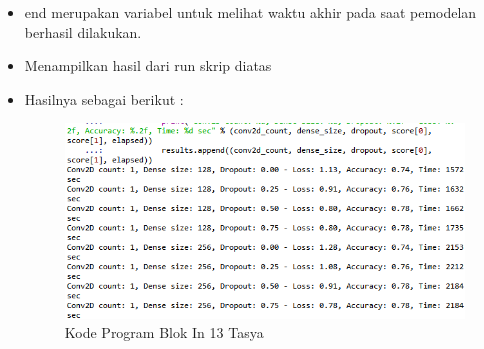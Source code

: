 \begin{itemize}
\item end merupakan variabel untuk melihat waktu akhir pada saat pemodelan berhasil dilakukan.
\item Menampilkan hasil dari run skrip diatas
\item Hasilnya sebagai berikut :\\
\begin{figure}[ht]
\centering
\includegraphics[scale=0.5]{figures/Chapter 7/1164086/Praktek/chapter7tasya26.png}
\caption{Kode Program Blok In 13 Tasya}
\label{Praktek}
\end{figure}
\end{itemize} 


